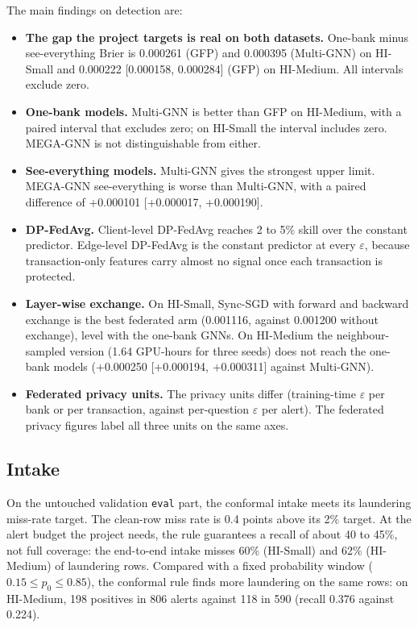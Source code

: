 \documentclass[11pt,a4paper]{article}
\newcommand{\eps}{\varepsilon}
\begin{document}
The main findings on detection are:
\begin{itemize}
\item \textbf{The gap the project targets is real on both datasets.} One-bank minus see-everything Brier is 0.000261 (GFP) and 0.000395 (Multi-GNN) on HI-Small and 0.000222 [0.000158, 0.000284] (GFP) on HI-Medium. All intervals exclude zero.
\item \textbf{One-bank models.} Multi-GNN is better than GFP on HI-Medium, with a paired interval that excludes zero; on HI-Small the interval includes zero. MEGA-GNN is not distinguishable from either.
\item \textbf{See-everything models.} Multi-GNN gives the strongest upper limit. MEGA-GNN see-everything is worse than Multi-GNN, with a paired difference of +0.000101 [+0.000017, +0.000190].
\item \textbf{DP-FedAvg.} Client-level DP-FedAvg reaches 2 to 5\% skill over the constant predictor. Edge-level DP-FedAvg is the constant predictor at every $\eps$, because transaction-only features carry almost no signal once each transaction is protected.
\item \textbf{Layer-wise exchange.} On HI-Small, Sync-SGD with forward and backward exchange is the best federated arm (0.001116, against 0.001200 without exchange), level with the one-bank GNNs. On HI-Medium the neighbour-sampled version (1.64 GPU-hours for three seeds) does not reach the one-bank models (+0.000250 [+0.000194, +0.000311] against Multi-GNN).
\item \textbf{Federated privacy units.} The privacy units differ (training-time $\eps$ per bank or per transaction, against per-question $\eps$ per alert). The federated privacy figures label all three units on the same axes.
\end{itemize}

\subsection{Intake}

On the untouched validation \texttt{eval} part, the conformal intake meets its laundering miss-rate target. The clean-row miss rate is 0.4 points above its 2\% target. At the alert budget the project needs, the rule guarantees a recall of about 40 to 45\%, not full coverage: the end-to-end intake misses 60\% (HI-Small) and 62\% (HI-Medium) of laundering rows. Compared with a fixed probability window ($0.15 \le p_0 \le 0.85$), the conformal rule finds more laundering on the same rows: on HI-Medium, 198 positives in 806 alerts against 118 in 590 (recall 0.376 against 0.224).
\end{document}
